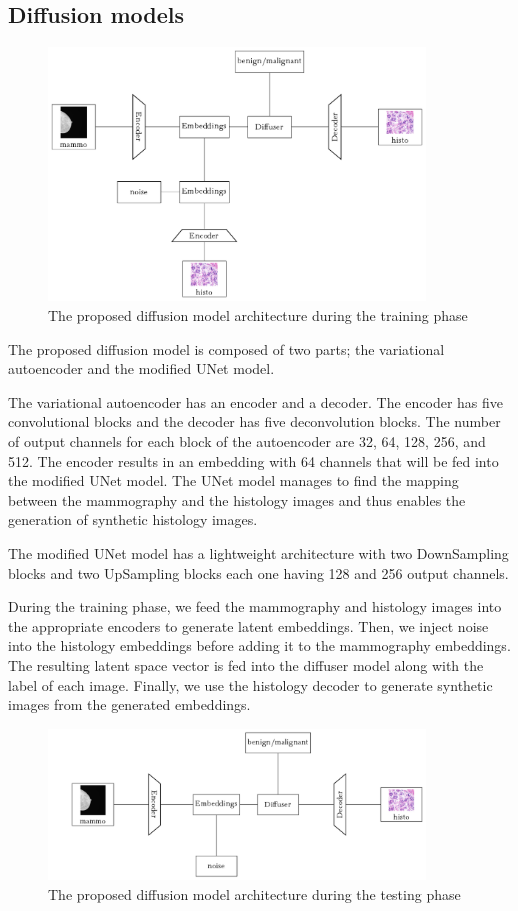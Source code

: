 \documentclass[11pt]{article}
\begin{document}
\subsection{Diffusion models}
\begin{figure}[h!]
        \centering
        \includegraphics[width=10cm]{diagram_2.pdf}
    
      \caption{The proposed diffusion model architecture during the training phase}
\end{figure}

 The proposed diffusion model is composed of two parts; the variational autoencoder and the modified UNet model. 

 The variational autoencoder has an encoder and a decoder. The encoder has five convolutional blocks and the decoder has five deconvolution blocks. The number of output channels for each block of the autoencoder are 32, 64, 128, 256, and 512. The encoder results in an embedding with 64 channels that will be fed into the modified UNet model. The UNet model manages to find the mapping between the mammography and the histology images and thus enables the generation of synthetic histology images.

 The modified UNet model has a lightweight architecture with two DownSampling blocks and two UpSampling blocks each one having 128 and 256 output channels. 

 During the training phase, we feed the mammography and histology images into the appropriate encoders to generate latent embeddings. Then, we inject noise into the histology embeddings before adding it to the mammography embeddings. The resulting latent space vector is fed into the diffuser model along with the label of each image. Finally, we use the histology decoder to generate synthetic images from the generated embeddings.

 \begin{figure}[h!]
        \centering
        \includegraphics[width=10cm]{test_diagram.pdf}
    
      \caption{The proposed diffusion model architecture during the testing phase}
\end{figure}
\end{document}
